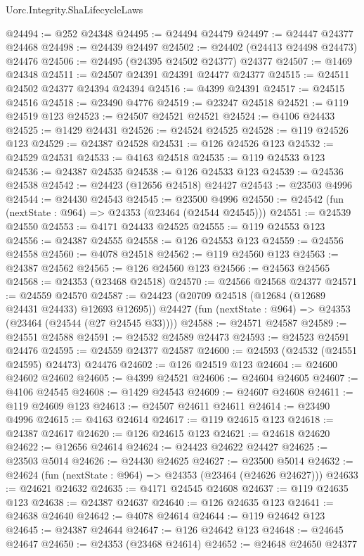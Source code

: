 \begin{lexlean}{Uorc.Integrity.ShaLifecycleLaws}
\begin{coremodule}
@24494 := @252 @24348
@24495 := @24494 @24479
@24497 := @24447 @24377 @24468
@24498 := @24439 @24497
@24502 := @24402 (@24413 @24498 @24473) @24476
@24506 := @24495 (@24395 @24502 @24377) @24377
@24507 := @1469 @24348
@24511 := @24507 @24391 @24391 @24477 @24377
@24515 := @24511 @24502 @24377 @24394 @24394
@24516 := @4399 @24391
@24517 := @24515 @24516
@24518 := @23490 @4776
@24519 := @23247 @24518
@24521 := @119 @24519 @123
@24523 := @24507 @24521 @24521
@24524 := @4106 @24433
@24525 := @1429 @24431
@24526 := @24524 @24525
@24528 := @119 @24526 @123
@24529 := @24387 @24528
@24531 := @126 @24526 @123
@24532 := @24529 @24531
@24533 := @4163 @24518
@24535 := @119 @24533 @123
@24536 := @24387 @24535
@24538 := @126 @24533 @123
@24539 := @24536 @24538
@24542 := @24423 (@12656 @24518) @24427
@24543 := @23503 @4996
@24544 := @24430 @24543
@24545 := @23500 @4996
@24550 := @24542 (fun (nextState : @964) => @24353 (@23464 (@24544 @24545)))
@24551 := @24539 @24550
@24553 := @4171 @24433 @24525
@24555 := @119 @24553 @123
@24556 := @24387 @24555
@24558 := @126 @24553 @123
@24559 := @24556 @24558
@24560 := @4078 @24518
@24562 := @119 @24560 @123
@24563 := @24387 @24562
@24565 := @126 @24560 @123
@24566 := @24563 @24565
@24568 := @24353 (@23468 @24518)
@24570 := @24566 @24568 @24377
@24571 := @24559 @24570
@24587 := @24423
    (@20709 @24518 (@12684 (@12689 @24431 @24433) @12693 @12695))
    @24427
    (fun (nextState : @964) => @24353 (@23464 (@24544 (@27 @24545 @33))))
@24588 := @24571 @24587
@24589 := @24551 @24588
@24591 := @24532 @24589 @24473
@24593 := @24523 @24591 @24476
@24595 := @24559 @24377 @24587
@24600 := @24593 (@24532 (@24551 @24595) @24473) @24476
@24602 := @126 @24519 @123
@24604 := @24600 @24602 @24602
@24605 := @4399 @24521
@24606 := @24604 @24605
@24607 := @4106 @24545
@24608 := @1429 @24543
@24609 := @24607 @24608
@24611 := @119 @24609 @123
@24613 := @24507 @24611 @24611
@24614 := @23490 @4996
@24615 := @4163 @24614
@24617 := @119 @24615 @123
@24618 := @24387 @24617
@24620 := @126 @24615 @123
@24621 := @24618 @24620
@24622 := @12656 @24614
@24624 := @24423 @24622 @24427
@24625 := @23503 @5014
@24626 := @24430 @24625
@24627 := @23500 @5014
@24632 := @24624 (fun (nextState : @964) => @24353 (@23464 (@24626 @24627)))
@24633 := @24621 @24632
@24635 := @4171 @24545 @24608
@24637 := @119 @24635 @123
@24638 := @24387 @24637
@24640 := @126 @24635 @123
@24641 := @24638 @24640
@24642 := @4078 @24614
@24644 := @119 @24642 @123
@24645 := @24387 @24644
@24647 := @126 @24642 @123
@24648 := @24645 @24647
@24650 := @24353 (@23468 @24614)
@24652 := @24648 @24650 @24377

\end{coremodule}
\end{lexlean}
